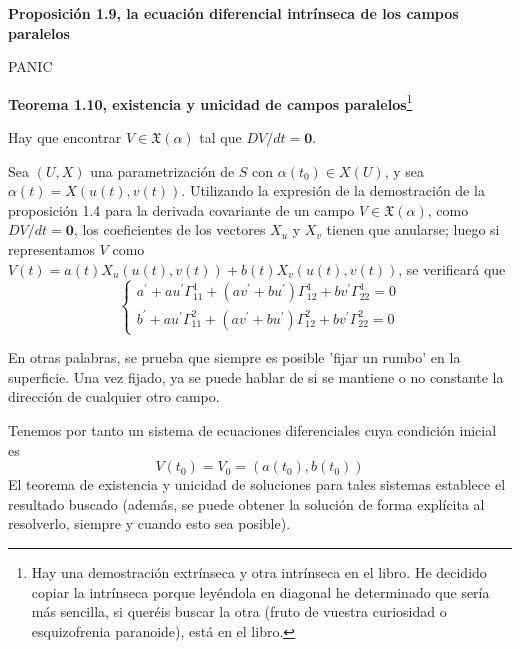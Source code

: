 \documentclass[openany]{book}
\begin{document}
\begin{center}
\textbf{Proposición 1.9, la ecuación diferencial intrínseca de los campos paralelos}
\end{center}
\begin{demonstration}
  PANIC
\end{demonstration}
\newpage
\begin{center}
\textbf{Teorema 1.10, existencia y unicidad de campos paralelos}\footnote{Hay una demostración extrínseca y otra intrínseca en el libro. He decidido copiar la intrínseca porque leyéndola en diagonal he determinado que sería más sencilla, si queréis buscar la otra (fruto de vuestra curiosidad o esquizofrenia paranoide), está en el libro.}
\end{center}
\begin{demonstration}

  Hay que encontrar $V \in \mathfrak{X}(\alpha)$ tal que $D V / d t=\mathbf{0}$.

  Sea $(U, X)$ una parametrización de $S$ con $\alpha\left(t_{0}\right) \in X(U)$, y sea $\alpha(t)=X(u(t), v(t))$. Utilizando la expresión de la demostración de la proposición 1.4 para la derivada covariante de un campo $V \in \mathfrak{X}(\alpha)$, como $D V / d t=\mathbf{0}$, los coeficientes de los vectores $X_{u}$ y $X_{v}$ tienen que anularse; luego si representamos $V$ como $V(t)=a(t) X_{u}(u(t), v(t))+b(t) X_{v}(u(t), v(t))$, se verificará que
$$
\left\{\begin{array}{l}
a^{\prime}+a u^{\prime} \Gamma_{11}^{1}+\left(a v^{\prime}+b u^{\prime}\right) \Gamma_{12}^{1}+b v^{\prime} \Gamma_{22}^{1}=0 \\
b^{\prime}+a u^{\prime} \Gamma_{11}^{2}+\left(a v^{\prime}+b u^{\prime}\right) \Gamma_{12}^{2}+b v^{\prime} \Gamma_{22}^{2}=0
\end{array}\right.
$$

En otras palabras, se prueba que siempre es posible 'fijar un rumbo' en la superficie. Una vez fijado, ya se puede hablar de si se mantiene o no constante la dirección de cualquier otro campo.

Tenemos por tanto un sistema de ecuaciones diferenciales cuya condición inicial es $$V\left(t_{0}\right)=V_{0}=\left(a\left(t_{0}\right), b\left(t_{0}\right)\right)$$ El teorema de existencia y unicidad de soluciones para tales sistemas establece el resultado buscado (además, se puede obtener la solución de forma explícita al resolverlo, siempre y cuando esto sea posible).

\end{demonstration}
\end{document}
